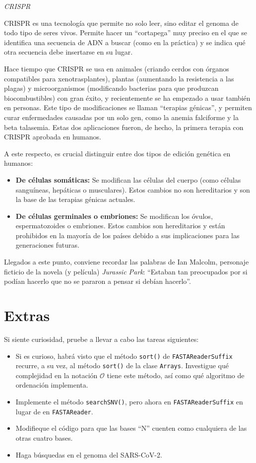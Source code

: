 \documentclass[10pt,a4paper,spanish]{article}
\newcommand{\sombreado}[2]{
  \begin{shaded}
    \begin{center} \emph{\textsc{#1}} \end{center}
    \noindent #2\\
  \end{shaded}
}
\newcommand{\code}[1]{\texttt{#1}}
\newcommand{\bigO}{\mathcal{O}}
\begin{document}
\sombreado{CRISPR}{CRISPR es una tecnología que permite no solo leer, sino editar el genoma de todo tipo de seres vivos. Permite hacer un ``cortapega'' muy preciso en el que se identifica una secuencia de ADN a buscar (como en la práctica) y se indica qué otra secuencia debe insertarse en su lugar.

Hace tiempo que CRISPR se usa en animales (criando cerdos con órganos compatibles para xenotrasplantes), plantas (aumentando la resistencia a las plagas) y microorganismos (modificando bacterias para que produzcan biocombustibles) con gran éxito, y recientemente se ha empezado a usar también en personas. Este tipo de modificaciones se llaman ``terapias génicas'', y permiten curar enfermedades causadas por un solo gen, como la anemia falciforme y la beta talasemia. Estas dos aplicaciones fueron, de hecho, la primera terapia con CRISPR aprobada en humanos.

A este respecto, es crucial distinguir entre dos tipos de edición genética en humanos:

\begin{itemize}
    \item \textbf{De células somáticas:} Se modifican las células del cuerpo (como células sanguíneas, hepáticas o musculares). Estos cambios no son hereditarios y son la base de las terapias génicas actuales.
    \item \textbf{De células germinales o embriones:} Se modifican los óvulos, espermatozoides o embriones. Estos cambios son hereditarios y están prohibidos en la mayoría de los países debido a sus implicaciones para las generaciones futuras.
\end{itemize}

Llegados a este punto, conviene recordar las palabras de Ian Malcolm, personaje ficticio de la novela (y película) \textit{Jurassic Park}: ``Estaban tan preocupados por si podían hacerlo que no se pararon a pensar si debían hacerlo''.
}

\section{Extras}

Si siente curiosidad, pruebe a llevar a cabo las tareas siguientes:

\begin{itemize}
    \item Si es curioso, habrá visto que el método \code{sort()} de \code{FASTAReaderSuffix} recurre, a su vez, al método \code{sort()} de la clase \code{Arrays}. Investigue qué complejidad en la notación $\bigO$ tiene este método, así como qué algoritmo de ordenación implementa.
    \item Implemente el método \code{searchSNV()}, pero ahora en \code{FASTAReaderSuffix} en lugar de en \code{FASTAReader}.
    \item Modifieque el código para que las bases ``N'' cuenten como cualquiera de las otras cuatro bases.
    \item Haga búsquedas en el genoma del SARS-CoV-2.
\end{itemize}
\end{document}
